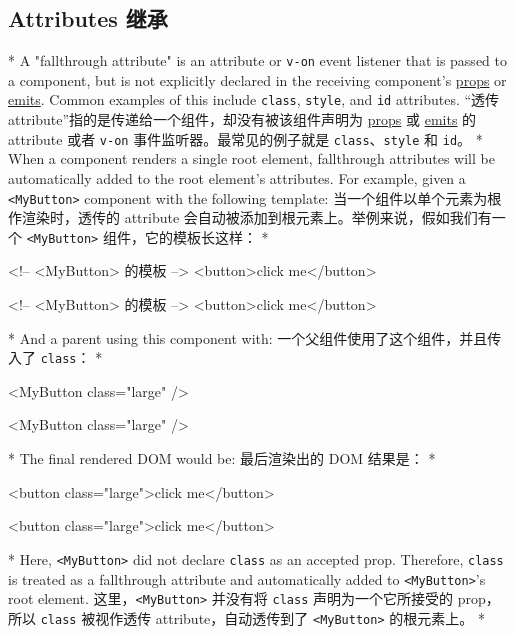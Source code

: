 \begin{paracol}{2}
\subsection{Attributes 继承}
\switchcolumn[0]*%
A "fallthrough attribute" is an attribute or \texttt{v-on} event
listener that is passed to a component, but is not explicitly declared
in the receiving component's
\href{https://vuejs.org/guide/components/props.html}{props} or
\href{https://vuejs.org/guide/components/events.html\#declaring-emitted-events}{emits}.
Common examples of this include \texttt{class}, \texttt{style}, and
\texttt{id} attributes.
\switchcolumn
``透传 attribute''指的是传递给一个组件，却没有被该组件声明为
\href{https://cn.vuejs.org/guide/components/props.html}{props} 或
\href{https://cn.vuejs.org/guide/components/events.html\#defining-custom-events}{emits}
的 attribute 或者 \texttt{v-on} 事件监听器。最常见的例子就是
\texttt{class}、\texttt{style} 和 \texttt{id}。
\switchcolumn[0]*%
When a component renders a single root element, fallthrough attributes
will be automatically added to the root element's attributes. For
example, given a \texttt{\textless{}MyButton\textgreater{}} component
with the following template:
\switchcolumn
当一个组件以单个元素为根作渲染时，透传的 attribute
会自动被添加到根元素上。举例来说，假如我们有一个
\texttt{\textless{}MyButton\textgreater{}} 组件，它的模板长这样：
\switchcolumn[0]*%
\begin{codeHtml}
<!-- <MyButton> 的模板 -->
<button>click me</button>
\end{codeHtml}
\switchcolumn
\begin{codeHtml}
<!-- <MyButton> 的模板 -->
<button>click me</button>
\end{codeHtml}
\switchcolumn[0]*%
And a parent using this component with:
\switchcolumn
一个父组件使用了这个组件，并且传入了 \texttt{class}：
\switchcolumn[0]*%
\begin{codeHtml}
<MyButton class="large" />
\end{codeHtml}
\switchcolumn
\begin{codeHtml}
<MyButton class="large" />
\end{codeHtml}
\switchcolumn[0]*%
The final rendered DOM would be:
\switchcolumn
最后渲染出的 DOM 结果是：
\switchcolumn[0]*%
\begin{codeHtml}
<button class="large">click me</button>
\end{codeHtml}
\switchcolumn
\begin{codeHtml}
<button class="large">click me</button>
\end{codeHtml}
\switchcolumn[0]*%
Here, \texttt{\textless{}MyButton\textgreater{}} did not declare
\texttt{class} as an accepted prop. Therefore, \texttt{class} is treated
as a fallthrough attribute and automatically added to
\texttt{\textless{}MyButton\textgreater{}}'s root element.
\switchcolumn
这里，\texttt{\textless{}MyButton\textgreater{}} 并没有将 \texttt{class}
声明为一个它所接受的 prop，所以 \texttt{class} 被视作透传
attribute，自动透传到了 \texttt{\textless{}MyButton\textgreater{}}
的根元素上。
\switchcolumn[0]*%

\end{paracol}
